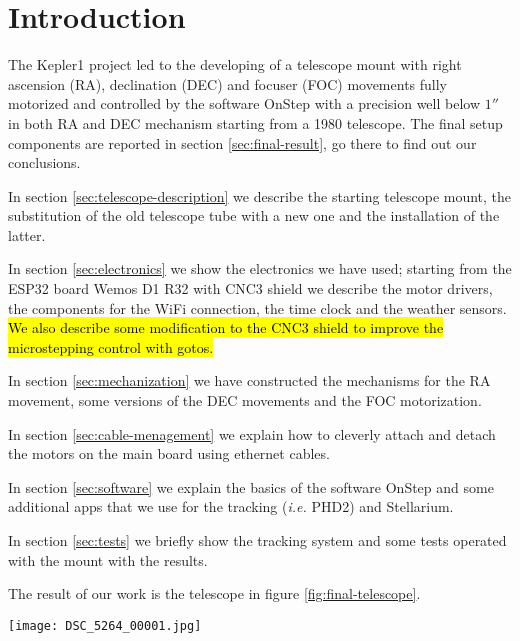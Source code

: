 \section*{Introduction}
\label{sec:Introduction}
The Kepler1 project led to the developing of a telescope mount with right ascension (RA), declination (DEC) and focuser (FOC) movements fully motorized and controlled by the software OnStep with a precision well below \(1''\) in both RA and DEC mechanism starting from a 1980 telescope.
The final setup components are reported in section \ref{sec:final-result}, go there to find out our conclusions.

In section \ref{sec:telescope-description} we describe the starting telescope mount, the substitution of the old telescope tube with a new one and the installation of the latter.

In section \ref{sec:electronics} we show the electronics we have used;
starting from the ESP32 board Wemos D1 R32 with CNC3 shield we describe the motor drivers, the components for the WiFi connection, the time clock and the weather sensors.
\hl{We also describe some modification to the CNC3 shield to improve the microstepping control with gotos.}

In section \ref{sec:mechanization} we have constructed the mechanisms for the RA movement, some versions of the DEC movements and the FOC motorization.

In section \ref{sec:cable-menagement} we explain how to cleverly attach and detach the motors on the main board using ethernet cables.

In section \ref{sec:software} we explain the basics of the software OnStep and some additional apps that we use for the tracking (\textit{i.e.} PHD2) and Stellarium.

In section \ref{sec:tests} we briefly show the tracking system and some tests operated with the mount with the results.

The result of our work is the telescope in figure \ref{fig:final-telescope}.

\begin{minipage}{0.5\textwidth}
    \centering
    \texttt{[image: DSC\_5264\_00001.jpg]}
    \label{fig:final-telescope}
\end{minipage}